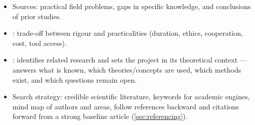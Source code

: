 \documentclass[../main.tex]{subfiles}
\begin{document}
\begin{itemize}
  \item Sources: practical field problems, gaps in specific knowledge, and conclusions of prior studies.
  \item {}: trade-off between rigour and practicalities (duration, ethics, cooperation, cost, tool access).
  \item {}: identifies related research and sets the project in its theoretical context — answers what is known, which theories/concepts are used, which methods exist, and which questions remain open.
  \item Search strategy: credible scientific literature, keywords for academic engines, mind map of authors and areas, follow references backward and citations forward from a strong baseline article (\autoref{sec:referencing}).
\end{itemize}
\end{document}
